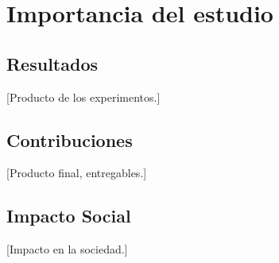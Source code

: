 \section{Importancia del estudio}
\label{sec:importancia}

\subsection{Resultados}
[Producto de los experimentos.]

\subsection{Contribuciones}
[Producto final, entregables.]

\subsection{Impacto Social}
[Impacto en la sociedad.]